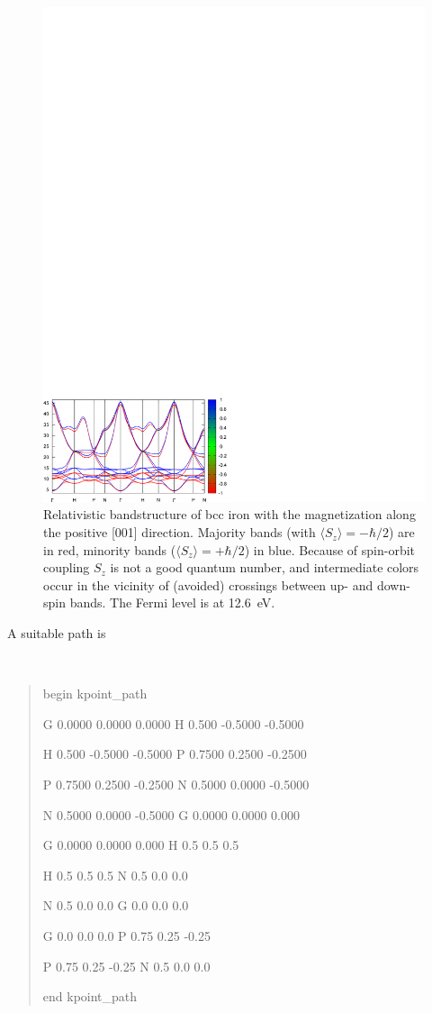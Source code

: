 \documentclass[a4paper,11pt,twoside]{article}
\begin{document}
\begin{figure}[h]
\begin{center}
\includegraphics[width=12cm]{Fe_bands}
\caption{Relativistic bandstructure of bcc iron with the magnetization
  along the positive [001] direction. Majority bands (with $\langle
  S_z\rangle=-\hbar/2$) are in red, minority bands ($\langle
  S_z\rangle =+\hbar/2$) in blue. Because of spin-orbit coupling $S_z$
  is not a good quantum number, and intermediate colors occur in the
  vicinity of (avoided) crossings between up- and down-spin bands.
  The Fermi level is at 12.6~eV.}
\label{fig:fe-bnd}
\end{center}
\end{figure}


A suitable path is
{\tt
\begin{quote}
begin kpoint\_path

G 0.0000 0.0000 0.0000   H 0.500 -0.5000 -0.5000

H 0.500 -0.5000 -0.5000  P 0.7500 0.2500 -0.2500

P 0.7500 0.2500 -0.2500  N 0.5000 0.0000 -0.5000

N 0.5000 0.0000 -0.5000  G 0.0000 0.0000 0.000

G 0.0000 0.0000 0.000    H 0.5 0.5 0.5

H 0.5 0.5 0.5            N 0.5 0.0 0.0

N 0.5 0.0 0.0            G 0.0 0.0 0.0

G 0.0 0.0 0.0            P 0.75 0.25 -0.25

P 0.75 0.25 -0.25        N 0.5 0.0 0.0

end kpoint\_path
\end{quote} }
\end{document}
